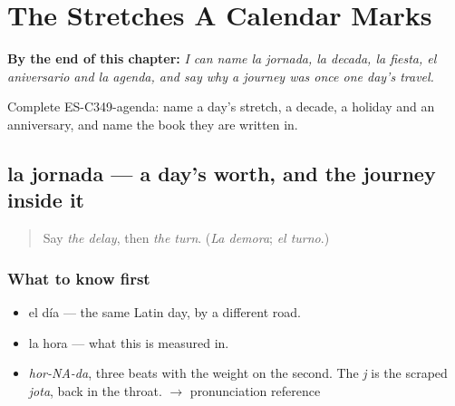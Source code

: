 
\chapter{The Stretches A Calendar Marks}
\label{ch:la-jornada-y-la-decada}

\begin{chapteropening}
\textbf{By the end of this chapter:} \emph{I can name la jornada, la decada, la fiesta, el aniversario and la agenda, and say why a journey was once one day's travel.}

Complete ES-C349-agenda: name a day's stretch, a decade, a holiday and an anniversary, and name the book they are written in.
\end{chapteropening}

\section[la jornada]{la jornada — a day's worth, and the journey inside it}

\label{lesson:ES-C349-jornada}



\begin{quote}
Say \emph{the delay}, then \emph{the turn}. (\emph{La demora}; \emph{el turno}.)
\end{quote}

\subsection*{What to know first}
\begin{itemize}
\raggedright
  \item el día — the same Latin day, by a different road.
  \item la hora — what this is measured in.
\end{itemize}

\begin{sounds}
\begin{itemize}
\raggedright
  \item \emph{hor-NA-da}, three beats with the weight on the second. The \emph{j} is the scraped \emph{jota}, back in the throat. $\to$ pronunciation reference
\end{itemize}
\end{sounds}

